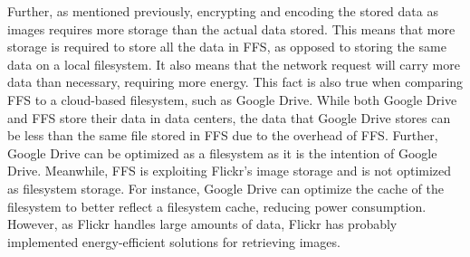 Further, as mentioned previously, encrypting and encoding the stored data as images requires more storage than the actual data stored. This means that more storage is required to store all the data in \gls{FFS}, as opposed to storing the same data on a local filesystem. It also means that the network request will carry more data than necessary, requiring more energy. This fact is also true when comparing \gls{FFS} to a \mbox{cloud-based} filesystem, such as Google Drive. While both Google Drive and \gls{FFS} store their data in data centers, the data that Google Drive stores can be less than the same file stored in \gls{FFS} due to the overhead of \gls{FFS}. Further, Google Drive can be optimized as a filesystem as it is the intention of Google Drive. Meanwhile, \gls{FFS} is exploiting Flickr's image storage and is not optimized as filesystem storage. For instance, Google Drive can optimize the cache of the filesystem to better reflect a filesystem cache, reducing power consumption. However, as Flickr handles large amounts of data, Flickr has probably implemented \mbox{energy-efficient} solutions for retrieving images. 


